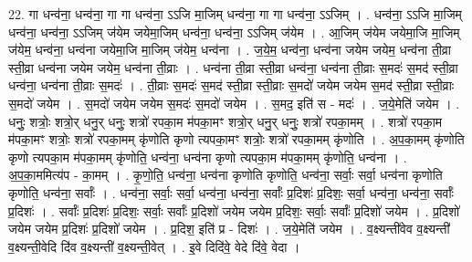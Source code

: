\documentclass[17pt]{extarticle}
\begin{document}
22. गा धन्व॑ना॒ धन्व॑ना॒ गा गा धन्व॑ना॒ ऽऽजि मा॒जिम् धन्व॑ना॒ गा गा धन्व॑ना॒ ऽऽजिम् । . धन्व॑ना॒ ऽऽजि मा॒जिम् धन्व॑ना॒ धन्व॑ना॒ ऽऽजिम् ज॑येम जयेमा॒जिम् धन्व॑ना॒ धन्व॑ना॒ ऽऽजिम् ज॑येम । . आ॒जिम् ज॑येम जयेमा॒जि मा॒जिम् ज॑येम॒ धन्व॑ना॒ धन्व॑ना जयेमा॒जि मा॒जिम् ज॑येम॒ धन्व॑ना । . ज॒ये॒म॒ धन्व॑ना॒ धन्व॑ना जयेम जयेम॒ धन्व॑ना ती॒व्रा स्ती॒व्रा धन्व॑ना जयेम जयेम॒ धन्व॑ना ती॒व्राः । . धन्व॑ना ती॒व्रा स्ती॒व्रा धन्व॑ना॒ धन्व॑ना ती॒व्राः स॒मदः॑ स॒मद॑ स्ती॒व्रा धन्व॑ना॒ धन्व॑ना ती॒व्राः स॒मदः॑ । . ती॒व्राः स॒मदः॑ स॒मद॑ स्ती॒व्रा स्ती॒व्राः स॒मदो॑ जयेम जयेम स॒मद॑ स्ती॒व्रा स्ती॒व्राः स॒मदो॑ जयेम । . स॒मदो॑ जयेम जयेम स॒मदः॑ स॒मदो॑ जयेम । . स॒मद॒ इति॑ स - मदः॑ । . ज॒ये॒मेति॑ जयेम । . धनुः॒ शत्रोः॒ शत्रो॒र् धनु॒र् धनुः॒ शत्रो॑ रपका॒म म॑पका॒मꣳ शत्रो॒र् धनु॒र् धनुः॒ शत्रो॑ रपका॒मम् । . शत्रो॑ रपका॒म म॑पका॒मꣳ शत्रोः॒ शत्रो॑ रपका॒मम् कृ॑णोति कृणो त्यपका॒मꣳ शत्रोः॒ शत्रो॑ रपका॒मम् कृ॑णोति । . अ॒प॒का॒मम् कृ॑णोति कृणो त्यपका॒म म॑पका॒मम् कृ॑णोति॒ धन्व॑ना॒ धन्व॑ना कृणो त्यपका॒म म॑पका॒मम् कृ॑णोति॒ धन्व॑ना । . अ॒प॒का॒ममित्य॑प - का॒मम् । . कृ॒णो॒ति॒ धन्व॑ना॒ धन्व॑ना कृणोति कृणोति॒ धन्व॑ना॒ सर्वाः॒ सर्वा॒ धन्व॑ना कृणोति कृणोति॒ धन्व॑ना॒ सर्वाः᳚ । . धन्व॑ना॒ सर्वाः॒ सर्वा॒ धन्व॑ना॒ धन्व॑ना॒ सर्वाः᳚ प्र॒दिशः॑ प्र॒दिशः॒ सर्वा॒ धन्व॑ना॒ धन्व॑ना॒ सर्वाः᳚ प्र॒दिशः॑ । . सर्वाः᳚ प्र॒दिशः॑ प्र॒दिशः॒ सर्वाः॒ सर्वाः᳚ प्र॒दिशो॑ जयेम जयेम प्र॒दिशः॒ सर्वाः॒ सर्वाः᳚ प्र॒दिशो॑ जयेम । . प्र॒दिशो॑ जयेम जयेम प्र॒दिशः॑ प्र॒दिशो॑ जयेम । . प्र॒दिश॒ इति॑ प्र - दिशः॑ । . ज॒ये॒मेति॑ जयेम । . व॒क्ष्यन्ती॑वेव व॒क्ष्यन्ती॑ व॒क्ष्यन्ती॒वेदि दि॑व व॒क्ष्यन्ती॑ व॒क्ष्यन्ती॒वेत् । . इ॒वे दिदि॑वे॒ वेदे दि॑वे॒ वेदा । \newline
\end{document}
